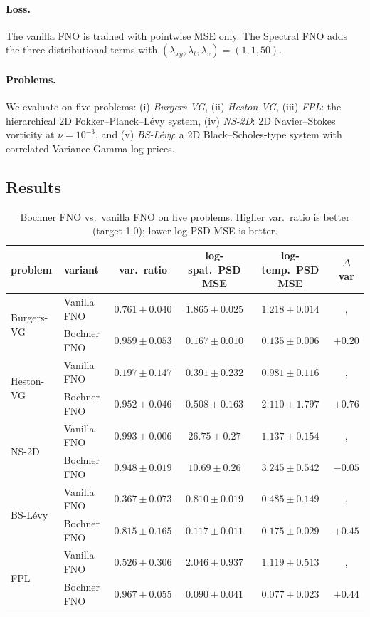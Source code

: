 \documentclass[review,12pt]{elsarticle}
\begin{document}
\paragraph{Loss.}
The vanilla FNO is trained with pointwise MSE only. The Spectral
FNO adds the three distributional terms with
$(\lambda_{xy}, \lambda_{t}, \lambda_{v}) = (1, 1, 50)$.

\paragraph{Problems.}
We evaluate on five problems:
(i) \emph{Burgers-VG}, (ii) \emph{Heston-VG},
(iii) \emph{FPL}: the hierarchical 2D Fokker--Planck--L\'evy system,
(iv) \emph{NS-2D}: 2D Navier--Stokes vorticity at $\nu = 10^{-3}$,
and (v) \emph{BS-L\'evy}: a 2D Black--Scholes-type system with
correlated Variance-Gamma log-prices.

\subsection{Results}
\label{subsec:fno-results}

\begin{table}[h]
\centering
\caption{Bochner FNO vs.\ vanilla FNO on five problems. Higher
var.\ ratio is better (target 1.0); lower log-PSD MSE is better.}
\label{tab:spectral-fno}
\begin{tabular}{l l c c c c}
\toprule
problem & variant & var.\ ratio & log-spat.\ PSD MSE & log-temp.\ PSD MSE & $\Delta$ var \\
\midrule
\multirow{2}{*}{Burgers-VG} &
 Vanilla FNO & $0.761 \pm 0.040$ & $1.865 \pm 0.025$ & $1.218 \pm 0.014$ &, \\
& Bochner FNO & $\mathbf{0.959 \pm 0.053}$ & $\mathbf{0.167 \pm 0.010}$ & $\mathbf{0.135 \pm 0.006}$ & $+0.20$ \\
\midrule
\multirow{2}{*}{Heston-VG} &
 Vanilla FNO & $0.197 \pm 0.147$ & $0.391 \pm 0.232$ & $0.981 \pm 0.116$ &, \\
& Bochner FNO & $\mathbf{0.952 \pm 0.046}$ & $0.508 \pm 0.163$ & $2.110 \pm 1.797$ & $\mathbf{+0.76}$ \\
\midrule
\multirow{2}{*}{NS-2D}   &
 Vanilla FNO & $\mathbf{0.993 \pm 0.006}$ & $26.75 \pm 0.27$ & $1.137 \pm 0.154$ &, \\
& Bochner FNO & $0.948 \pm 0.019$ & $\mathbf{10.69 \pm 0.26}$ & $3.245 \pm 0.542$ & $-0.05$ \\
\midrule
\multirow{2}{*}{BS-L\'evy} &
 Vanilla FNO & $0.367 \pm 0.073$ & $0.810 \pm 0.019$ & $0.485 \pm 0.149$ &, \\
& Bochner FNO & $\mathbf{0.815 \pm 0.165}$ & $\mathbf{0.117 \pm 0.011}$ & $\mathbf{0.175 \pm 0.029}$ & $+0.45$ \\
\midrule
\multirow{2}{*}{FPL}    &
 Vanilla FNO & $0.526 \pm 0.306$ & $2.046 \pm 0.937$ & $1.119 \pm 0.513$ &, \\
& Bochner FNO & $\mathbf{0.967 \pm 0.055}$ & $\mathbf{0.090 \pm 0.041}$ & $\mathbf{0.077 \pm 0.023}$ & $+0.44$ \\
\bottomrule
\end{tabular}
\end{table}
\end{document}
